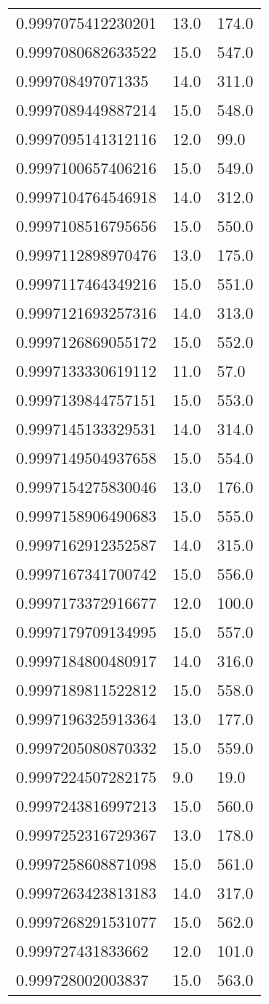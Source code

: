 \begin{center}
\begin{supertabular}[H]{p{0.30\textwidth}p{0.05\textwidth}p{0.05\textwidth}}
0.9997075412230201 & 13.0 & 174.0 \\ 
0.9997080682633522 & 15.0 & 547.0 \\ 
0.999708497071335 & 14.0 & 311.0 \\ 
0.9997089449887214 & 15.0 & 548.0 \\ 
0.9997095141312116 & 12.0 & 99.0 \\ 
0.9997100657406216 & 15.0 & 549.0 \\ 
0.9997104764546918 & 14.0 & 312.0 \\ 
0.9997108516795656 & 15.0 & 550.0 \\ 
0.9997112898970476 & 13.0 & 175.0 \\ 
0.9997117464349216 & 15.0 & 551.0 \\ 
0.9997121693257316 & 14.0 & 313.0 \\ 
0.9997126869055172 & 15.0 & 552.0 \\ 
0.9997133330619112 & 11.0 & 57.0 \\ 
0.9997139844757151 & 15.0 & 553.0 \\ 
0.9997145133329531 & 14.0 & 314.0 \\ 
0.9997149504937658 & 15.0 & 554.0 \\ 
0.9997154275830046 & 13.0 & 176.0 \\ 
0.9997158906490683 & 15.0 & 555.0 \\ 
0.9997162912352587 & 14.0 & 315.0 \\ 
0.9997167341700742 & 15.0 & 556.0 \\ 
0.9997173372916677 & 12.0 & 100.0 \\ 
0.9997179709134995 & 15.0 & 557.0 \\ 
0.9997184800480917 & 14.0 & 316.0 \\ 
0.9997189811522812 & 15.0 & 558.0 \\ 
0.9997196325913364 & 13.0 & 177.0 \\ 
0.9997205080870332 & 15.0 & 559.0 \\ 
0.9997224507282175 & 9.0 & 19.0 \\ 
0.9997243816997213 & 15.0 & 560.0 \\ 
0.9997252316729367 & 13.0 & 178.0 \\ 
0.9997258608871098 & 15.0 & 561.0 \\ 
0.9997263423813183 & 14.0 & 317.0 \\ 
0.9997268291531077 & 15.0 & 562.0 \\ 
0.999727431833662 & 12.0 & 101.0 \\ 
0.999728002003837 & 15.0 & 563.0 \\ 

\end{supertabular}
\end{center}
